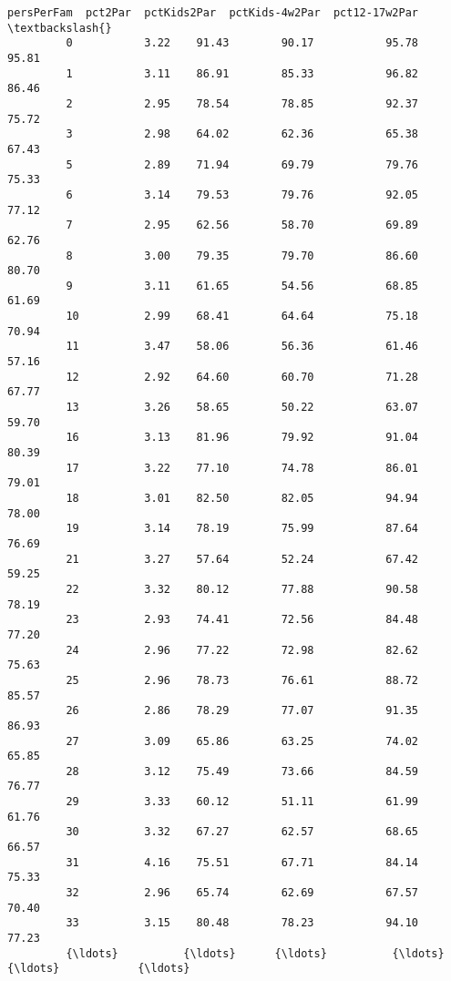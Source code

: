 \documentclass[11pt]{llncs}
\begin{document}
\begin{Verbatim}[commandchars=\\\{\}]
               persPerFam  pct2Par  pctKids2Par  pctKids-4w2Par  pct12-17w2Par  \textbackslash{}
         0           3.22    91.43        90.17           95.78          95.81   
         1           3.11    86.91        85.33           96.82          86.46   
         2           2.95    78.54        78.85           92.37          75.72   
         3           2.98    64.02        62.36           65.38          67.43   
         5           2.89    71.94        69.79           79.76          75.33   
         6           3.14    79.53        79.76           92.05          77.12   
         7           2.95    62.56        58.70           69.89          62.76   
         8           3.00    79.35        79.70           86.60          80.70   
         9           3.11    61.65        54.56           68.85          61.69   
         10          2.99    68.41        64.64           75.18          70.94   
         11          3.47    58.06        56.36           61.46          57.16   
         12          2.92    64.60        60.70           71.28          67.77   
         13          3.26    58.65        50.22           63.07          59.70   
         16          3.13    81.96        79.92           91.04          80.39   
         17          3.22    77.10        74.78           86.01          79.01   
         18          3.01    82.50        82.05           94.94          78.00   
         19          3.14    78.19        75.99           87.64          76.69   
         21          3.27    57.64        52.24           67.42          59.25   
         22          3.32    80.12        77.88           90.58          78.19   
         23          2.93    74.41        72.56           84.48          77.20   
         24          2.96    77.22        72.98           82.62          75.63   
         25          2.96    78.73        76.61           88.72          85.57   
         26          2.86    78.29        77.07           91.35          86.93   
         27          3.09    65.86        63.25           74.02          65.85   
         28          3.12    75.49        73.66           84.59          76.77   
         29          3.33    60.12        51.11           61.99          61.76   
         30          3.32    67.27        62.57           68.65          66.57   
         31          4.16    75.51        67.71           84.14          75.33   
         32          2.96    65.74        62.69           67.57          70.40   
         33          3.15    80.48        78.23           94.10          77.23   
         {\ldots}          {\ldots}      {\ldots}          {\ldots}             {\ldots}            {\ldots}   

\end{Verbatim}
\end{document}
